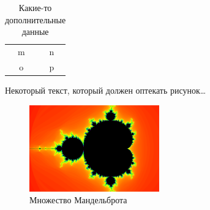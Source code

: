 \documentclass[a4paper, 12pt]{article}
\begin{document}
    \begin{table}[p] %
        \begin{tabular}{|c|c|}
            m & n\\
            o & p
        \end{tabular}
        \caption{Какие-то дополнительные данные} %
        \label{tab:table9} %
    \end{table}

    Некоторый текст, который должен оптекать рисунок\dots
    \begin{figure}
        \includegraphics[width = 0.5\textwidth]{image.png}
        \caption{Множество Мандельброта} %
        \label{fig:figure3} %
    \end{figure}

\end{document}
